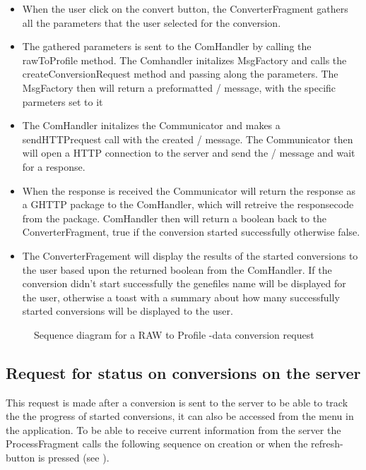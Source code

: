     \begin{itemize}
    	
        \item
        	When the user click on the convert button, the ConverterFragment gathers all the parameters that the user selected for the conversion.
      	\item
        	The gathered parameters is sent to the ComHandler by calling the rawToProfile method. The Comhandler initalizes MsgFactory and calls the createConversionRequest method and passing along the parameters. The MsgFactory then will return a preformatted \json/ message, with the specific parmeters set to it
     	\item
        	The ComHandler initalizes the Communicator and makes a sendHTTPrequest call with the created \json/ message. The Communicator then will open a HTTP connection to the server and send the \json/ message and wait for a response.
    	\item
        	When the response is received the Communicator will return the response as a GHTTP package to the ComHandler, which will retreive the responsecode from the package. ComHandler then will return a boolean back to the ConverterFragment, true if the conversion started successfully otherwise false.
     	\item
        	The ConverterFragement will display the results of the started conversions to the user based upon the returned boolean from the ComHandler. If the conversion didn't start successfully the genefiles name will be displayed for the user, otherwise a toast with a summary about how many successfully started conversions will be displayed to the user.
    \end{itemize}
    
	\begin{figure}
        \caption{Sequence diagram for a RAW to Profile -data conversion request}
        \label{fig:and_convertseq}
 	\end{figure}
   \FloatBarrier

\subsection{Request for status on conversions on the server}
	This request is made after a conversion is sent to the server to be able to track the the progress of started conversions, it can also be accessed from the menu in the application. To be able to receive current information from the server the ProcessFragment calls the following sequence on creation or when the refresh-button is pressed (see ).
    
